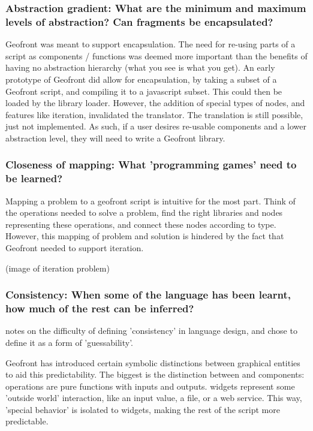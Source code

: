\subsubsection*{Abstraction gradient: What are the minimum and maximum levels of abstraction? Can fragments be encapsulated?}

Geofront was meant to support encapsulation. 
The need for re-using parts of a script as components / functions was deemed more important than the benefits of having no abstraction hierarchy (what you see is what you get).
An early prototype of Geofront did allow for encapsulation, by taking a subset of a Geofront script, and compiling it to a javascript subset. This could then be loaded by the library loader. 
However, the addition of special types of nodes, and features like iteration, invalidated the  translator.
The translation is still possible, just not implemented.  
As such, if a user desires re-usable components and a lower abstraction level, they will need to write a Geofront library.


\subsubsection*{Closeness of mapping: What 'programming games' need to be learned?}

Mapping a problem to a geofront script is intuitive for the most part.
Think of the operations needed to solve a problem, 
find the right libraries and nodes representing these operations,
and connect these nodes according to type. 
However, this mapping of problem and solution is hindered by the fact that Geofront needed to support iteration. 

(image of iteration problem)



\subsubsection*{Consistency: When some of the language has been learnt, how much of the rest can be inferred?}

\cite[]{green_usability_1996} notes on the difficulty of defining 'consistency' in language design, and chose to define it as a form of 'guessability'.

Geofront has introduced certain symbolic distinctions between graphical entities to aid this predictability. 
The biggest is the distinction between  and  components: 
operations are pure functions with inputs and outputs. 
widgets represent some 'outside world' interaction, like an input value, a file, or a web service. 
This way, 'special behavior' is isolated to widgets, making the rest of the script more predictable. 

